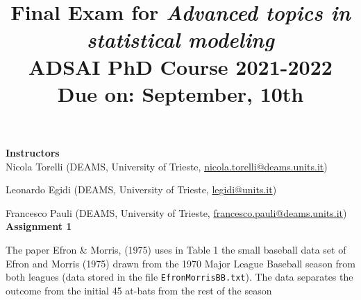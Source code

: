 \title{\large{
\textbf{Final Exam for \emph{Advanced topics in statistical modeling}}\\
ADSAI PhD Course 2021-2022 }\\
Due on: September, 10th}
%
%
\date{}
\maketitle
%
\hspace{-0.8cm}
\textbf{Instructors} \\

Nicola Torelli (DEAMS, University of Trieste, \url{nicola.torelli@deams.units.it})

Leonardo Egidi (DEAMS, University of Trieste, \url{legidi@units.it})

Francesco Pauli (DEAMS, University of Trieste, \url{francesco.pauli@deams.units.it})\\

\hspace{-0.8cm}
\textbf{Assignment 1}
\vspace{0.5cm}

The paper Efron \& Morris, (1975) uses in Table 1 the small baseball data set of Efron and Morris (1975) drawn from the 1970 Major League Baseball season from both leagues (data stored in the file \texttt{EfronMorrisBB.txt}). The data separates the outcome from the initial 45 at-bats from the rest of the season

